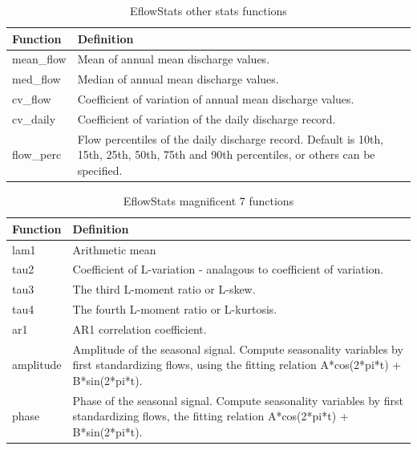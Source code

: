 \documentclass[a4paper,11pt]{article}\usepackage[]{graphicx}\usepackage[]{color}
\begin{document}
\begin{table}[ht]
  \centering
  \begin{threeparttable}[b]
  \caption{EflowStats other stats functions}
  \label{tab:otherStats}
\begin{tabularx}{\textwidth}{|l|X|}
  \hline
\textbf{Function} & \textbf{Definition} \\ 
  \hline
  mean\_flow & Mean of annual mean discharge values. \\
  med\_flow & Median of annual mean discharge values. \\
  cv\_flow & Coefficient of variation of annual mean discharge values. \\
  cv\_daily & Coefficient of variation of the daily discharge record. \\
  flow\_perc & Flow percentiles of the daily discharge record. Default is 10th, 15th, 25th, 50th, 75th and 90th percentiles, or others can be specified. \\
   \hline
\end{tabularx}
\end{threeparttable}
\end{table}

\begin{table}[ht]
  \centering
  \begin{threeparttable}[b]
  \caption{EflowStats magnificent 7 functions}
  \label{tab:mag7Stats}
\begin{tabularx}{\textwidth}{|l|X|}
  \hline
\textbf{Function} & \textbf{Definition} \\ 
  \hline
  lam1 & Arithmetic mean \\
  tau2 & Coefficient of L-variation - analagous to coefficient of variation. \\
  tau3 & The third L-moment ratio or L-skew. \\
  tau4 & The fourth L-moment ratio or L-kurtosis. \\
  ar1 & AR1 correlation coefficient. \\
  amplitude & Amplitude of the seasonal signal. Compute seasonality variables by first standardizing flows, using the fitting relation A*cos(2*pi*t) + B*sin(2*pi*t). \\
  phase & Phase of the seasonal signal. Compute seasonality variables by first standardizing flows, the fitting relation A*cos(2*pi*t) + B*sin(2*pi*t). \\
   \hline
\end{tabularx}
\end{threeparttable}
\end{table}
\end{document}
